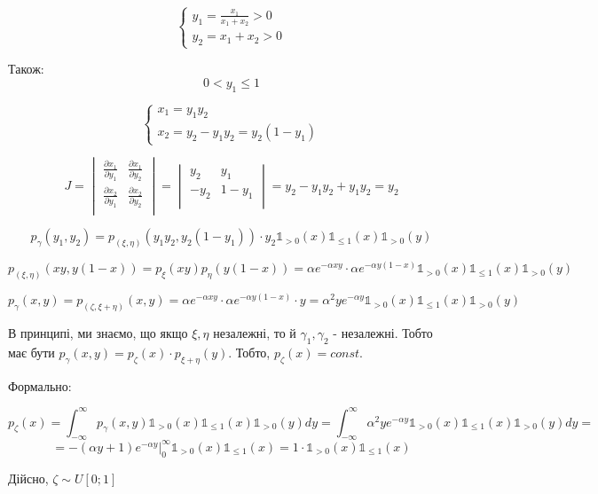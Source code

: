 \documentclass[11pt, a4paper]{article} %
\begin{document}
$$\begin{cases}
    y_1 = \frac{x_1}{x_1+x_2} > 0\\
    y_2 = x_1+x_2 > 0
\end{cases}$$

Також:
$$\boxed{0 < y_1 \le 1}$$

$$\begin{cases}
    x_1 = y_1 y_2 \\
    x_2 = y_2 - y_1 y_2 = y_2 (1-y_1)
\end{cases}$$

$$
J = \begin{vmatrix}
    \frac{\partial x_1}{\partial y_1} & \frac{\partial x_1}{\partial y_2} \\
    \frac{\partial x_2}{\partial y_1} & \frac{\partial x_2}{\partial y_2} \\
\end{vmatrix} 
= \begin{vmatrix}
    y_2 & y_1 \\
    -y_2 & 1-y_1 \\
\end{vmatrix} = y_2 - y_1y_2 + y_1 y_2 = y_2
$$

$$p_\gamma(y_1,y_2) = p_{(\xi,\eta)} (y_1 y_2, y_2 (1-y_1)) \cdot y_2 \mathbb{1}_{> 0}(x)\mathbb{1}_{\le 1}(x)\mathbb{1}_{> 0}(y)$$

$$p_{(\xi,\eta)} (x y, y (1-x)) = p_\xi(xy) p_\eta(y(1-x)) 
= \alpha e^{-\alpha xy} \cdot \alpha e^{-\alpha y(1-x)} \mathbb{1}_{> 0}(x)\mathbb{1}_{\le 1}(x)\mathbb{1}_{> 0}(y) $$

$$p_\gamma(x,y) = p_{(\zeta,\xi+\eta)}(x,y) = \alpha e^{-\alpha xy} \cdot \alpha e^{-\alpha y(1-x)} \cdot y 
= \alpha^2 ye^{-\alpha y} \mathbb{1}_{> 0}(x)\mathbb{1}_{\le 1}(x)\mathbb{1}_{> 0}(y)$$

В принципі, ми знаємо, що якщо $\xi, \eta$ незалежні, то й $\gamma_1, \gamma_2$ - незалежні.
Тобто має бути $p_\gamma(x,y) = p_\zeta(x) \cdot p_{\xi+\eta}(y)$. 
Тобто, $p_\zeta(x) = const$.

Формально:

$$p_\zeta(x) = \int_{-\infty}^\infty p_\gamma(x,y)\mathbb{1}_{> 0}(x)\mathbb{1}_{\le 1}(x)\mathbb{1}_{> 0}(y) dy 
= \int_{-\infty}^\infty \alpha^2 ye^{-\alpha y}\mathbb{1}_{> 0}(x)\mathbb{1}_{\le 1}(x)\mathbb{1}_{> 0}(y) dy =$$
$$= - \left. (\alpha y + 1) e^{-\alpha y} \right|_{0}^\infty \mathbb{1}_{> 0}(x)\mathbb{1}_{\le 1}(x)
= 1 \cdot \mathbb{1}_{> 0}(x)\mathbb{1}_{\le 1}(x)$$

Дійсно, $\zeta \sim U[0;1]$ \qedsymbol
\end{document}
